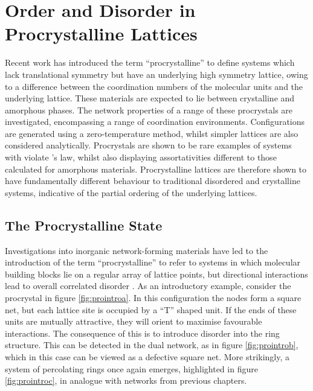 \chapter[Order and Disorder in Procrystalline Lattices]{Order and Disorder in \\ Procrystalline Lattices} 

\begin{chapterabstract}
Recent work has introduced the term ``procrystalline'' to define systems which lack translational symmetry but have an underlying high symmetry lattice, owing to a difference between the coordination numbers of the molecular units and the underlying lattice.
These materials are expected to lie between crystalline and amorphous phases.
The network properties of a range of these procrystals are investigated, encompassing a range of coordination environments.
Configurations are generated using a zero\--temperature \mc{} method, whilst simpler lattices are also considered analytically.
Procrystals are shown to be rare examples of systems with violate \lm{}'s law, whilst also displaying assortativities different to those calculated for amorphous materials.
Procrystalline lattices are therefore shown to have fundamentally different behaviour to traditional disordered and crystalline systems, indicative of the partial ordering of the underlying lattices.
\end{chapterabstract}

\section{The Procrystalline State}

Investigations into inorganic network\--forming materials have led to the introduction of the term ``procrystalline'' to refer to systems in which molecular building blocks lie on a regular array of lattice points, but directional interactions lead to overall correlated disorder \cite{Overy2016}.
As an introductory example, consider the procrystal in figure \ref{fig:prointroa}.
In this configuration the nodes form a square net, but each lattice site is occupied by a ``T'' shaped unit.
If the ends of these units are mutually attractive, they will orient to maximise favourable interactions.
The consequence of this is to introduce disorder into the ring structure.
This can be detected in the dual network, as in figure \ref{fig:prointrob}, which in this case can be viewed as a defective square net.
More strikingly, a system of percolating rings once again emerges, highlighted in figure \ref{fig:prointroc}, in analogue with networks from previous chapters. 

